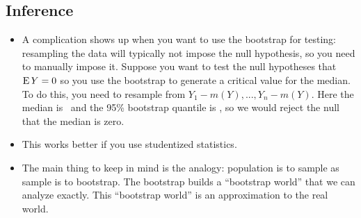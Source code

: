 \subsection{Inference}

\begin{itemize}[leftmargin=0pt]

\item A complication shows up when you want to use the bootstrap for
  testing: resampling the data will typically not impose the null
  hypothesis, so you need to manually impose it.  Suppose you want to
  test the null hypotheses that $\operatorname{E} Y = 0$ so you use the bootstrap to
  generate a critical value for the median.  To do this, you need to
  resample from $Y_1 - m(Y),...,Y_n - m(Y)$.
  \renewcommand*\FancyVerbStartString{## block 6}
  Here the median is \ymedian\ and the 95\% bootstrap quantile is
  \bootinference, so we would reject the null that the median is zero.

\item This works better if you use studentized statistics.
  
\item The main thing to keep in mind is the analogy: population is to
  sample as sample is to bootstrap.  The bootstrap builds a
  ``bootstrap world'' that we can analyze exactly.  This ``bootstrap
  world'' is an approximation to the real world.

\end{itemize}

